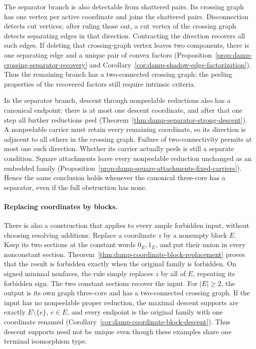 \documentclass[11pt]{article}
\numberwithin{equation}{section}
\theoremstyle{definition}
\theoremstyle{remark}
\begin{document}
The separator branch is also detectable from shattered pairs.  Its
crossing graph has one vertex per active coordinate and joins the
shattered pairs.  Disconnection detects cut vertices; after ruling those
out, a cut vertex of the crossing graph detects separating edges in
that direction.  Contracting the direction recovers all such edges.
If deleting that crossing-graph vertex leaves two components, there is
one separating edge and a unique pair of convex factors
(Proposition~\ref{prop:damp-crossing-separator-recovery} and
Corollary~\ref{cor:damp-shadow-edge-factorization}).  Thus the
remaining branch has a two-connected crossing graph; the peeling
properties of the recovered factors still require intrinsic criteria.

In the separator branch, descent through nonpeelable reductions
also has a canonical endpoint: there is at most one descent coordinate,
and after that one step all further reductions peel
(Theorem~\ref{thm:damp-separator-strong-descent}).  A nonpeelable
carrier must retain every remaining coordinate, so its direction is
adjacent to all others in the crossing graph.  Failure of two-connectivity
permits at most one such direction.  Whether its carrier actually peels
is still a separate condition.  Square attachments leave every
nonpeelable reduction unchanged as an embedded family
(Proposition~\ref{prop:damp-square-attachments-fixed-carriers}).
Hence the same conclusion holds whenever the canonical three-core has
a separator, even if the full obstruction has none.

\paragraph{Replacing coordinates by blocks.}
There is also a construction that applies to every ample forbidden input,
without choosing resolving additions.  Replace a coordinate \(z\) by a
nonempty block \(E\).  Keep its two sections at the constant words
\(0_E,1_E\), and put their union in every nonconstant section.
Theorem~\ref{thm:damp-coordinate-block-replacement} proves that the result
is forbidden exactly when the original family is forbidden.  On signed
minimal nonfaces, the rule simply replaces \(z\) by all of \(E\),
repeating its forbidden sign.  The two constant sections recover the input.
For \(|E|\ge2\), the output is its own graph three-core and has a
two-connected crossing graph.  If the input has no nonpeelable proper
reduction, the maximal descent supports are exactly
\(E\setminus\{e\}\), \(e\in E\), and every endpoint is the original
family with one coordinate renamed
(Corollary~\ref{cor:damp-coordinate-block-descent}).  Thus descent supports
need not be unique even though these examples share one terminal
isomorphism type.
\end{document}
